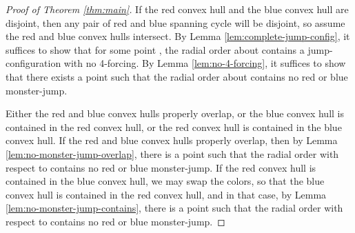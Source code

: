 \documentclass[12pt]{article}
\theoremstyle{definition}
\begin{document}
\begin{proof}[Proof of Theorem \ref{thm:main}]
If the red convex hull and the blue convex hull are disjoint, then any pair of red and blue spanning cycle will be disjoint, so assume the red and blue convex hulls intersect.
By Lemma \ref{lem:complete-jump-config}, it suffices to show that for some point , the radial order about  contains a jump-configuration with no 4-forcing.
By Lemma \ref{lem:no-4-forcing}, it suffices to show that there exists a point  such that the radial order about  contains no red or blue monster-jump.

Either the red and blue convex hulls properly overlap, or the blue convex hull is contained in the red convex hull, or the red convex hull is contained in the blue convex hull.
If the red and blue convex hulls properly overlap, then by Lemma \ref{lem:no-monster-jump-overlap}, there is a point  such that the radial order with respect to  contains no red or blue monster-jump.
If the red convex hull is contained in the blue convex hull, we may swap the colors, so that the blue convex hull is contained in the red convex hull, and in that case, by Lemma \ref{lem:no-monster-jump-contains}, there is a point  such that the radial order with respect to  contains no red or blue monster-jump.
\end{proof}

{}

\end{document}
